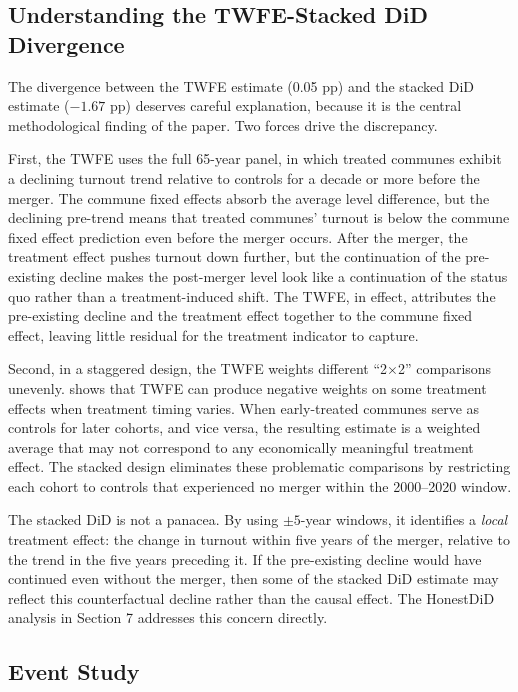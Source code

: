 \documentclass[12pt]{article}
\begin{document}
\subsection{Understanding the TWFE-Stacked DiD Divergence}

The divergence between the TWFE estimate (0.05 pp) and the stacked DiD estimate ($-1.67$ pp) deserves careful explanation, because it is the central methodological finding of the paper. Two forces drive the discrepancy.

First, the TWFE uses the full 65-year panel, in which treated communes exhibit a declining turnout trend relative to controls for a decade or more before the merger. The commune fixed effects absorb the average level difference, but the declining pre-trend means that treated communes' turnout is below the commune fixed effect prediction even before the merger occurs. After the merger, the treatment effect pushes turnout down further, but the continuation of the pre-existing decline makes the post-merger level look like a continuation of the status quo rather than a treatment-induced shift. The TWFE, in effect, attributes the pre-existing decline and the treatment effect together to the commune fixed effect, leaving little residual for the treatment indicator to capture.

Second, in a staggered design, the TWFE weights different ``2$\times$2'' comparisons unevenly. \citet{goodmanbacon2021difference} shows that TWFE can produce negative weights on some treatment effects when treatment timing varies. When early-treated communes serve as controls for later cohorts, and vice versa, the resulting estimate is a weighted average that may not correspond to any economically meaningful treatment effect. The stacked design eliminates these problematic comparisons by restricting each cohort to controls that experienced no merger within the 2000--2020 window.

The stacked DiD is not a panacea. By using $\pm 5$-year windows, it identifies a \textit{local} treatment effect: the change in turnout within five years of the merger, relative to the trend in the five years preceding it. If the pre-existing decline would have continued even without the merger, then some of the stacked DiD estimate may reflect this counterfactual decline rather than the causal effect. The HonestDiD analysis in Section 7 addresses this concern directly.

\subsection{Event Study}
\end{document}
